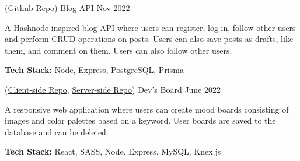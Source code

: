 

\begin{cventries}

  \cventry
    {\href{https://github.com/LamiSaadat/blog-api}{(Github Repo)}} %
    {Blog API} %
    {} %
    {Nov 2022} %
    {
      \begin{cvitems} %
        \item {A Hashnode-inspired blog API where users can register, log in, follow other users and perform CRUD operations on posts. Users can also save posts as drafts, like them, and comment on them. Users can also follow other users.}
        \item {\textbf{Tech Stack:} Node, Express, PostgreSQL, Prisma}
      \end{cvitems}
    }


  \cventry
    {(\href{https://github.com/LamiSaadat/devs-board-client}{Client-side Repo}, \href{https://github.com/LamiSaadat/devs-board-server}{Server-side Repo})} %
    {Dev's Board} %
    {} %
    {June 2022} %
    {
      \begin{cvitems} %
        \item {A responsive web application where users can create mood boards consisting of images and color palettes based on a keyword. User boards are saved to the database and can be deleted.}
        \item {\textbf{Tech Stack:} React, SASS, Node, Express, MySQL, Knex.js}
      \end{cvitems}
    }

\end{cventries}

